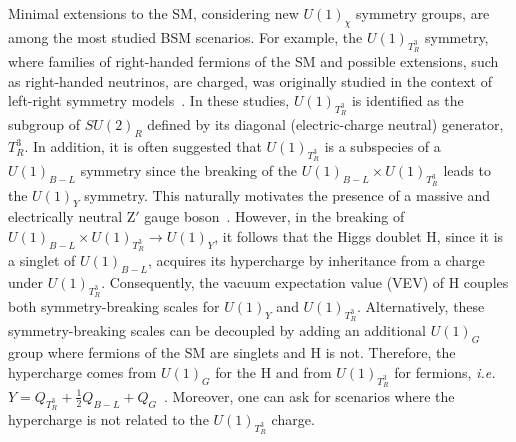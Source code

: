 

Minimal extensions to the SM, considering new $U(1)_{\chi}$ symmetry groups, are among the most studied BSM scenarios. For example, the  $U(1)_{T^3_R}$ symmetry, where families of right-handed fermions of the SM and possible extensions, such as right-handed neutrinos, are charged, was originally studied in the context of left-right symmetry models~\parencite{PatiSalam1974, MohapatraPati1975, SenjanovicMohapatra1975}. In these studies, $U(1)_{T^3_R}$ is identified as the subgroup of $SU(2)_R$ defined by its diagonal (electric-charge neutral) generator, $T^3_R$. In addition, it is often suggested that  $U(1)_{T^3_R}$ is a subspecies of a $U(1)_{B-L}$ symmetry since the breaking of the $U(1)_{B-L} \times U(1)_{T^3_R}$ leads to the $ U(1)_Y$ symmetry. This naturally motivates the presence of a massive and electrically neutral $\textrm{Z}'$ gauge boson~\parencite{DiLuzio2018, Baker2019, Michaels:2020fzj, Dev:2021otb, Florez2023}. However, in the breaking of  $U(1)_{B-L} \times U(1)_{T^3_R} \rightarrow U(1)_Y$, it follows that the Higgs doublet $\mathrm{H}$, since it is a singlet of $U(1)_{B-L}$,  acquires its hypercharge by inheritance from a charge under $U(1)_{T^3_R}$. Consequently, the vacuum expectation value (VEV) of $\mathrm{H}$  couples both symmetry-breaking scales for $U(1)_Y$ and $U(1)_{T^3_R}$. Alternatively, these symmetry-breaking scales can be decoupled by adding an additional $U(1)_G$ group where fermions of the SM are singlets and $\mathrm{H}$ is not. Therefore, the hypercharge comes from $U(1)_G$ for the $\mathrm{H}$ and from $U(1)_{T^3_R}$ for fermions, \textit{i.e.} $Y=Q_{T^3_R}+\frac{1}{2}Q_{B-L} + Q_G$~\parencite{Dutta:2022qvn}. Moreover, one can ask for scenarios where the hypercharge is not related to the $U(1)_{T^{3}_{R}}$ charge. 

